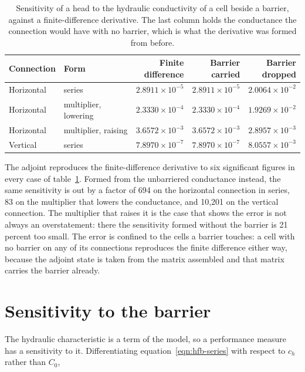 \begin{table}[htb]
	\centering
	\caption{Sensitivity of a head to the hydraulic conductivity of a cell
	beside a barrier, against a finite-difference derivative. The last column
	holds the conductance the connection would have with no barrier, which is
	what the derivative was formed from before.}
	\label{tab:hfb}
	\small
	\begin{tabular}{llrrr}
		\toprule
		Connection & Form &
		\shortstack[r]{Finite\\difference} &
		\shortstack[r]{Barrier\\carried} &
		\shortstack[r]{Barrier\\dropped} \\
		\midrule
		Horizontal & series               & $2.8911 \times 10^{-5}$ & $2.8911 \times 10^{-5}$ & $2.0064 \times 10^{-2}$ \\
		Horizontal & multiplier, lowering & $2.3330 \times 10^{-4}$ & $2.3330 \times 10^{-4}$ & $1.9269 \times 10^{-2}$ \\
		Horizontal & multiplier, raising  & $3.6572 \times 10^{-3}$ & $3.6572 \times 10^{-3}$ & $2.8957 \times 10^{-3}$ \\
		Vertical   & series               & $7.8970 \times 10^{-7}$ & $7.8970 \times 10^{-7}$ & $8.0557 \times 10^{-3}$ \\
		\bottomrule
	\end{tabular}
\end{table}

The adjoint reproduces the finite-difference derivative to six significant figures in every case of table~\ref{tab:hfb}. Formed from the unbarriered conductance instead, the same sensitivity is out by a factor of 694 on the horizontal connection in series, 83 on the multiplier that lowers the conductance, and 10,201 on the vertical connection. The multiplier that raises it is the case that shows the error is not always an overstatement: there the sensitivity formed without the barrier is 21 percent too small. The error is confined to the cells a barrier touches: a cell with no barrier on any of its connections reproduces the finite difference either way, because the adjoint state is taken from the matrix \mf{} assembled and that matrix carries the barrier already.

\section*{Sensitivity to the barrier}

The hydraulic characteristic is a term of the model, so a performance measure has a sensitivity to it. Differentiating equation~\ref{eqn:hfb-series} with respect to $c_{h}$ rather than $C_{0}$,

